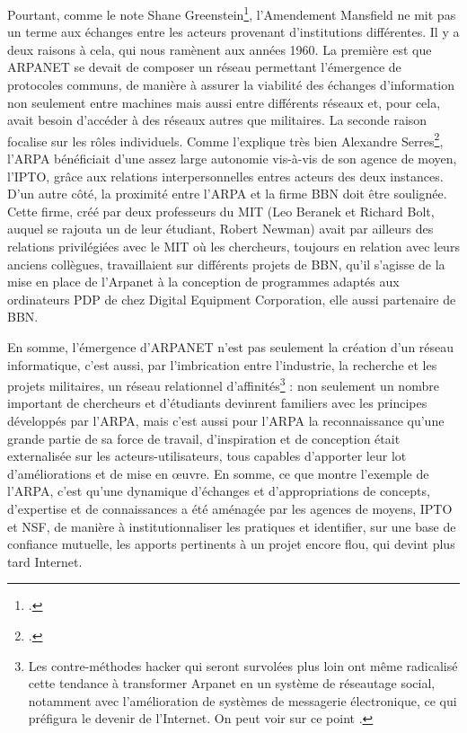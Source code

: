 \documentclass{FramateX}
\begin{document}
\begin{refsection}
Pourtant, comme le note Shane Greenstein\footnote{\cite{greensteinnurturing2011}.},
l'Amendement Mansfield ne mit pas un terme aux
échanges entre les acteurs provenant d'institutions
différentes. Il y a deux raisons à cela, qui nous ramènent aux années
1960. La première est que ARPANET se devait de composer un réseau
permettant l'émergence de protocoles communs, de
manière à assurer la viabilité des échanges
d'information non seulement entre machines mais aussi
entre différents réseaux et, pour cela, avait besoin
d'accéder à des réseaux autres que militaires. La
seconde raison focalise sur les rôles individuels. Comme
l'explique très bien Alexandre Serres\footnote{\cite[p.~347 \textit{sq.}]{serresaux2000}.},
l'ARPA bénéficiait d'une assez large
autonomie vis-à-vis de son agence de moyen, l'IPTO,
grâce aux relations interpersonnelles entres acteurs des deux
instances. D'un autre côté, la proximité entre l'ARPA
et la firme BBN doit être soulignée. Cette firme, créé par deux
professeurs du MIT (Leo Beranek et Richard Bolt, auquel se rajouta un
de leur étudiant, Robert Newman) avait par ailleurs des relations
privilégiées avec le MIT où les chercheurs, toujours en relation avec
leurs anciens collègues, travaillaient sur différents projets de BBN,
qu'il s'agisse de la mise en place de
l'Arpanet à la conception de programmes adaptés aux
ordinateurs PDP de chez Digital Equipment Corporation, elle aussi
partenaire de BBN.

En somme, l'émergence d'ARPANET
n'est pas seulement la création d'un
réseau informatique, c'est aussi, par
l'imbrication entre l'industrie, la
recherche et les projets militaires, un réseau relationnel
d'affinités\footnote{Les contre-méthodes hacker qui
seront survolées plus loin ont même radicalisé cette tendance à
transformer Arpanet en un système de réseautage social, notamment avec
l'amélioration de systèmes de messagerie électronique, ce qui préfigura
le devenir de l'Internet. On peut voir sur ce point \cite{paloquebergesentre2011}.} : non seulement un nombre
important de chercheurs et d'étudiants devinrent
familiers avec les principes développés par l'ARPA,
mais c'est aussi pour l'ARPA la
reconnaissance qu'une grande partie de sa force de
travail, d'inspiration et de conception était
externalisée sur les acteurs-utilisateurs, tous capables
d'apporter leur lot d'améliorations
et de mise en œuvre. En somme, ce que montre l'exemple
de l'ARPA, c'est
qu'une dynamique d'échanges et
d'appropriations de concepts,
d'expertise et de connaissances a été aménagée par les
agences de moyens, IPTO et NSF, de manière à institutionnaliser les
pratiques et identifier, sur une base de confiance mutuelle, les
apports pertinents à un projet encore flou, qui devint plus tard
Internet.


\end{refsection}
\end{document}
